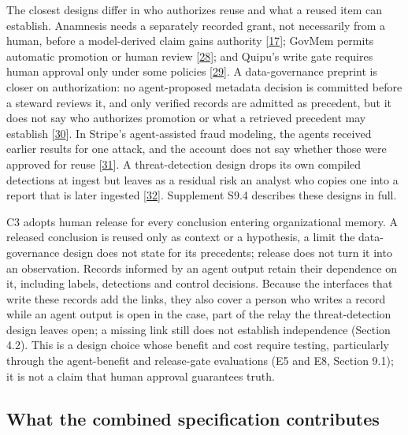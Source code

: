 \documentclass[acmlarge,review,anonymous,nonacm]{acmart}
\begin{document}
The closest designs differ in who authorizes reuse and what a reused
item can establish. Anamnesis needs a separately recorded grant, not
necessarily from a human, before a model-derived claim gains authority
{[}\protect\hyperlink{ref-Dan2026Anamnesis}{17}{]}; GovMem permits
automatic promotion or human review
{[}\protect\hyperlink{ref-Qi2026GovMem}{28}{]}; and Quipu's write gate
requires human approval only under some policies
{[}\protect\hyperlink{ref-Brown2026Quipu}{29}{]}. A data-governance
preprint is closer on authorization: no agent-proposed metadata decision
is committed before a steward reviews it, and only verified records are
admitted as precedent, but it does not say who authorizes promotion or
what a retrieved precedent may establish
{[}\protect\hyperlink{ref-Akhtar2026Contestable}{30}{]}. In Stripe's
agent-assisted fraud modeling, the agents received earlier results for
one attack, and the account does not say whether those were approved for
reuse {[}\protect\hyperlink{ref-Drapeau2026ScalingRadar}{31}{]}. A
threat-detection design drops its own compiled detections at ingest but
leaves as a residual risk an analyst who copies one into a report that
is later ingested
{[}\protect\hyperlink{ref-Evron2026AdversaryBrains}{32}{]}. Supplement
S9.4 describes these designs in full.

C3 adopts human release for every conclusion entering organizational
memory. A released conclusion is reused only as context or a hypothesis,
a limit the data-governance design does not state for its precedents;
release does not turn it into an observation. Records informed by an
agent output retain their dependence on it, including labels, detections
and control decisions. Because the interfaces that write these records
add the links, they also cover a person who writes a record while an
agent output is open in the case, part of the relay the threat-detection
design leaves open; a missing link still does not establish independence
(Section 4.2). This is a design choice whose benefit and cost require
testing, particularly through the agent-benefit and release-gate
evaluations (E5 and E8, Section 9.1); it is not a claim that human
approval guarantees truth.

\hypertarget{what-the-combined-specification-contributes}{%
\subsection{What the combined specification
contributes}\label{what-the-combined-specification-contributes}}
\end{document}
